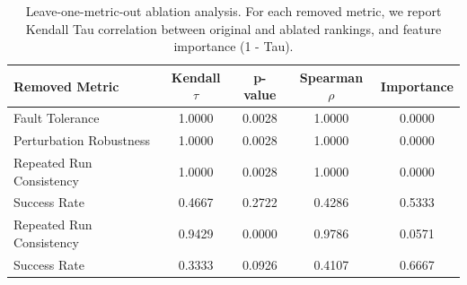 \begin{table}[t]
\centering
\caption{Leave-one-metric-out ablation analysis. For each removed metric, we report Kendall Tau correlation between original and ablated rankings, and feature importance (1 - Tau).}
\label{tab:ablation}
\begin{tabular}{lcccc}
\toprule
Removed Metric & Kendall $\tau$ & p-value & Spearman $\rho$ & Importance \\
\midrule
Fault Tolerance & 1.0000 & 0.0028 & 1.0000 & 0.0000 \\
Perturbation Robustness & 1.0000 & 0.0028 & 1.0000 & 0.0000 \\
Repeated Run Consistency & 1.0000 & 0.0028 & 1.0000 & 0.0000 \\
Success Rate & 0.4667 & 0.2722 & 0.4286 & 0.5333 \\
Repeated Run Consistency & 0.9429 & 0.0000 & 0.9786 & 0.0571 \\
Success Rate & 0.3333 & 0.0926 & 0.4107 & 0.6667 \\
\bottomrule
\end{tabular}
\end{table}
